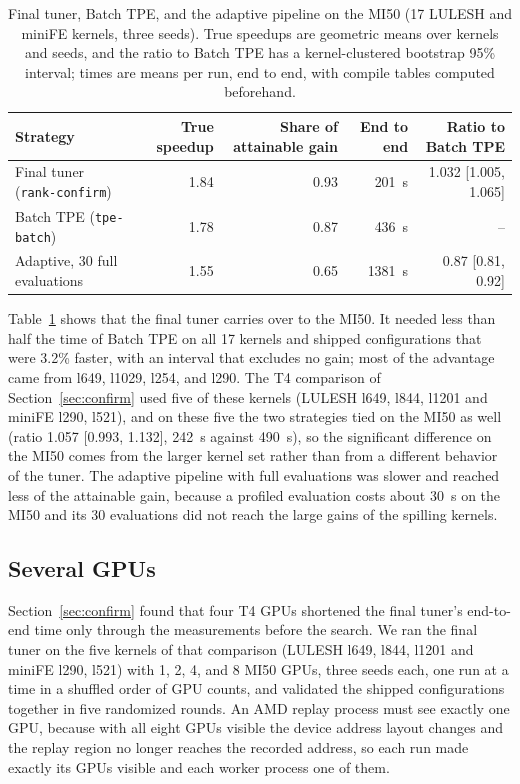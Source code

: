 \documentclass[10pt]{article}
\newcommand{\code}[1]{\texttt{#1}}
\begin{document}
\begin{table}[t]
\centering
\caption{Final tuner, Batch TPE, and the adaptive pipeline on the MI50 (17 LULESH and miniFE kernels, three seeds). True speedups are geometric means over kernels and seeds, and the ratio to Batch TPE has a kernel-clustered bootstrap 95\% interval; times are means per run, end to end, with compile tables computed beforehand.}
\label{tab:mi50tuner}
\small
\begin{tabular}{lrrrr}
\toprule
Strategy & True speedup & Share of attainable gain & End to end & Ratio to Batch TPE \\
\midrule
Final tuner (\code{rank-confirm}) & 1.84 & 0.93 & 201~s & 1.032 [1.005, 1.065] \\
Batch TPE (\code{tpe-batch}) & 1.78 & 0.87 & 436~s & -- \\
Adaptive, 30 full evaluations & 1.55 & 0.65 & 1381~s & 0.87 [0.81, 0.92] \\
\bottomrule
\end{tabular}
\end{table}

Table~\ref{tab:mi50tuner} shows that the final tuner carries over to the MI50.
It needed less than half the time of Batch TPE on all 17 kernels and shipped
configurations that were 3.2\% faster, with an interval that excludes no gain;
most of the advantage came from l649, l1029, l254, and l290. The T4 comparison
of Section~\ref{sec:confirm} used five of these kernels (LULESH l649, l844,
l1201 and miniFE l290, l521), and on these five the two strategies tied on the
MI50 as well (ratio 1.057 [0.993, 1.132], 242~s against 490~s), so the
significant difference on the MI50 comes from the larger kernel set rather than
from a different behavior of the tuner. The
adaptive pipeline with full evaluations was slower and reached less of the
attainable gain, because a profiled evaluation costs about 30~s on the MI50 and
its 30 evaluations did not reach the large gains of the spilling kernels.

\subsection{Several GPUs}
\label{sec:amd-gpus}
Section~\ref{sec:confirm} found that four T4 GPUs shortened the final tuner's
end-to-end time only through the measurements before the search. We ran the
final tuner on the five kernels of that comparison (LULESH l649, l844, l1201
and miniFE l290, l521) with 1, 2, 4, and 8 MI50 GPUs, three seeds each, one run
at a time in a shuffled order of GPU counts, and validated the shipped
configurations together in five randomized rounds. An AMD replay process must
see exactly one GPU, because with all eight GPUs visible the device address
layout changes and the replay region no longer reaches the recorded address,
so each run made exactly its GPUs visible and each worker process one of them.
\end{document}
